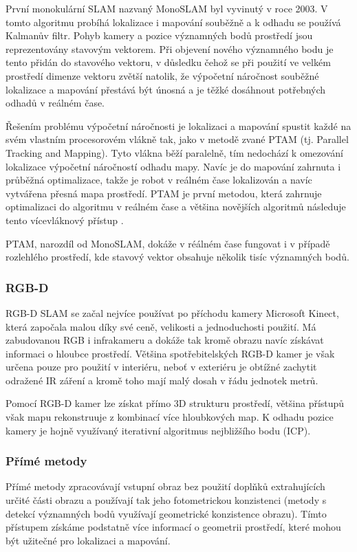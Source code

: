 \documentclass[12pt,a4paper]{article}
\begin{document}
První monokulární SLAM nazvaný MonoSLAM byl vyvinutý v roce 2003. V tomto algoritmu probíhá lokalizace i mapování souběžně a k odhadu se používá Kalmanův filtr. Pohyb kamery a pozice významných bodů prostředí jsou reprezentovány stavovým vektorem. Při objevení nového významného bodu je tento přidán do stavového vektoru, v důsledku čehož se při použití ve velkém prostředí dimenze vektoru zvětší natolik, že výpočetní náročnost souběžné lokalizace a mapování přestává být únosná a je těžké dosáhnout potřebných odhadů v reálném čase. 

Řešením problému výpočetní náročnosti je lokalizaci a mapování spustit každé na svém vlastním procesorovém vlákně tak, jako v metodě zvané PTAM (tj. Parallel Tracking and Mapping). Tyto vlákna běží paralelně, tím nedochází k omezování lokalizace výpočetní náročností odhadu mapy. Navíc je do mapování zahrnuta i průběžná optimalizace, takže je robot v reálném čase lokalizován a navíc vytvářena přesná mapa prostředí. PTAM je první metodou, která zahrnuje optimalizaci do algoritmu v reálném čase a většina novějších algoritmů následuje tento vícevláknový přístup \cite{Taketomi_visual}.

PTAM, narozdíl od MonoSLAM, dokáže v réálném čase fungovat i v případě rozlehlého prostředí, kde stavový vektor obsahuje několik tisíc významných bodů.

\subsubsection{RGB-D}
RGB-D SLAM se začal nejvíce používat po příchodu kamery Microsoft Kinect, která započala malou  díky své ceně, velikosti a jednoduchosti použití. Má zabudovanou RGB i infrakameru a dokáže tak kromě obrazu navíc získávat informaci o hloubce prostředí. Většina spotřebitelských RGB-D kamer je však určena pouze pro použití v interiéru, neboť v exteriéru je obtížné zachytit odražené IR záření a kromě toho mají malý dosah v řádu jednotek metrů.

Pomocí RGB-D kamer lze získat přímo 3D strukturu prostředí, většina přístupů však mapu rekonstruuje z kombinací více hloubkových map. K odhadu pozice kamery je hojně využívaný iterativní algoritmus nejbližšího bodu (ICP). 

\subsubsection{Přímé metody}
Přímé metody zpracovávají vstupní obraz bez použití doplňků extrahujících určité části obrazu a používají tak jeho fotometrickou konzistenci (metody s detekcí významných bodů využívají geometrické konzistence obrazu). Tímto přístupem získáme podstatně více informací o geometrii prostředí, které mohou být užitečné pro lokalizaci a mapování.
\end{document}
